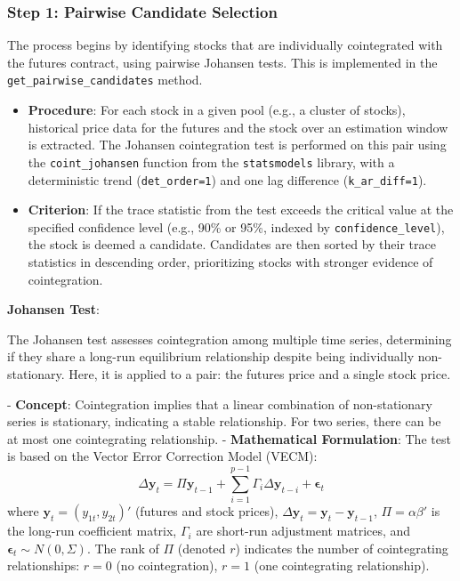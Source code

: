 \documentclass[a4paper,12pt]{article}
\begin{document}
\subsubsection{Step 1: Pairwise Candidate Selection}
The process begins by identifying stocks that are individually cointegrated with the futures contract, using pairwise Johansen tests. This is implemented in the \texttt{get\_pairwise\_candidates} method.

\begin{itemize}
    \item \textbf{Procedure}: For each stock in a given pool (e.g., a cluster of stocks), historical price data for the futures and the stock over an estimation window is extracted. The Johansen cointegration test is performed on this pair using the \texttt{coint\_johansen} function from the \texttt{statsmodels} library, with a deterministic trend (\texttt{det\_order=1}) and one lag difference (\texttt{k\_ar\_diff=1}).
    \item \textbf{Criterion}: If the trace statistic from the test exceeds the critical value at the specified confidence level (e.g., 90\% or 95\%, indexed by \texttt{confidence\_level}), the stock is deemed a candidate. Candidates are then sorted by their trace statistics in descending order, prioritizing stocks with stronger evidence of cointegration.
\end{itemize}

\textbf{Johansen Test}:

The Johansen test assesses cointegration among multiple time series, determining if they share a long-run equilibrium relationship despite being individually non-stationary. Here, it is applied to a pair: the futures price and a single stock price.

- \textbf{Concept}: Cointegration implies that a linear combination of non-stationary series is stationary, indicating a stable relationship. For two series, there can be at most one cointegrating relationship.
- \textbf{Mathematical Formulation}: The test is based on the Vector Error Correction Model (VECM):
  \[
  \Delta \mathbf{y}_t = \Pi \mathbf{y}_{t-1} + \sum_{i=1}^{p-1} \Gamma_i \Delta \mathbf{y}_{t-i} + \mathbf{\epsilon}_t
  \]
  where \(\mathbf{y}_t = (y_{1t}, y_{2t})'\) (futures and stock prices), \(\Delta \mathbf{y}_t = \mathbf{y}_t - \mathbf{y}_{t-1}\), \(\Pi = \alpha \beta'\) is the long-run coefficient matrix, \(\Gamma_i\) are short-run adjustment matrices, and \(\mathbf{\epsilon}_t \sim N(0, \Sigma)\). The rank of \(\Pi\) (denoted \(r\)) indicates the number of cointegrating relationships: \(r = 0\) (no cointegration), \(r = 1\) (one cointegrating relationship).
\end{document}
